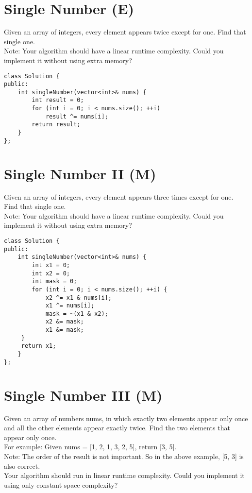 \section{Single Number (E)}
Given an array of integers, every element appears twice except for one. Find that single one.\\

Note: Your algorithm should have a linear runtime complexity. Could you implement it without using extra memory? \\

\begin{lstlisting}
class Solution {
public:
    int singleNumber(vector<int>& nums) {
        int result = 0;
        for (int i = 0; i < nums.size(); ++i)
            result ^= nums[i];
        return result;
    }
};
\end{lstlisting}


\section{Single Number II (M)}
Given an array of integers, every element appears three times except for one. Find that single one. \\

Note: Your algorithm should have a linear runtime complexity. Could you implement it without using extra memory? \\

\begin{lstlisting}
class Solution {
public:
    int singleNumber(vector<int>& nums) {
        int x1 = 0;   
        int x2 = 0; 
        int mask = 0;
        for (int i = 0; i < nums.size(); ++i) {
            x2 ^= x1 & nums[i];
            x1 ^= nums[i];
            mask = ~(x1 & x2);
            x2 &= mask;
            x1 &= mask;
     }
     return x1;
    }
};
\end{lstlisting}


\section{Single Number III (M)}
Given an array of numbers nums, in which exactly two elements appear only once and all the other elements appear exactly twice. Find the two elements that appear only once. \\

For example: Given nums = [1, 2, 1, 3, 2, 5], return [3, 5].\\

Note:
    The order of the result is not important. So in the above example, [5, 3] is also correct.\\
    Your algorithm should run in linear runtime complexity. Could you implement it using only constant space complexity?\\

